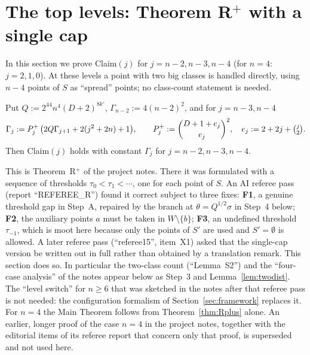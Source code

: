 \section{The top levels: Theorem R$^+$ with a single cap}\label{sec:top}

In this section we prove Claim$(j)$ for $j=n-2,n-3,n-4$ (for $n=4$: $j=2,1,0$). At these levels a point
with two big classes is handled directly, using $n-4$ points of $S$ as ``spread'' points; no class-count
statement is needed.

\begin{theorem}[Theorem R$^+$]\label{thm:Rplus}
Put $Q:=2^{44}n^4(D+2)^{8k'}$, $\Gamma_{n-2}:=4(n-2)^2$, and for $j=n-3,n-4$
\begin{equation}\label{eq:Gamma-top}
\Gamma_j:=P^+_j\,\bigl(2Q\Gamma_{j+1}+2(j^2+2n)+1\bigr),\qquad P^+_j:=\binom{D+1+e_j}{e_j}^{2},\quad
e_j:=2+2j+\tbinom j2 .
\end{equation}
Then Claim$(j)$ holds with constant $\Gamma_j$ for $j=n-2,n-3,n-4$.
\end{theorem}

\begin{remark}\label{rem:Rplus-prov}
This is Theorem~R$^+$ of the project notes. There it was formulated with a sequence of thresholds
$\tau_0<\tau_1<\cdots$, one for each point of $S$. An AI referee pass (report ``REFEREE\_R'') found it correct
subject to three fixes: \textbf{F1}, a genuine threshold gap in Step~A, repaired by the branch at
$\theta=Q^{1/2}\sigma$ in Step~4 below; \textbf{F2}, the auxiliary points $a$ must be taken in $W\setminus\{b\}$;
\textbf{F3}, an undefined threshold $\tau_{-1}$, which is moot here because only the points of $S'$ are used and
$S'=\emptyset$ is allowed. A later referee pass (``referee15'', item~X1) asked that the single-cap version
be written out in full rather than obtained by a translation remark. This section does so. In particular the
two-class count (``Lemma~S2'') and the ``four-case analysis'' of the notes appear below as Step~3 and
Lemma~\ref{lem:twodist}. The ``level switch'' for $n\ge6$ that was sketched in the notes after that referee pass is not
needed: the configuration formalism of Section~\ref{sec:framework} replaces it. For $n=4$ the Main Theorem follows from
Theorem~\ref{thm:Rplus} alone. An earlier, longer proof of the case $n=4$ in the project notes, together with the editorial
items of its referee report that concern only that proof, is superseded and not used here.
\end{remark}

